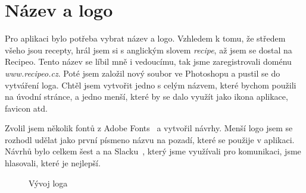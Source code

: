\section{Název a logo}
Pro aplikaci bylo potřeba vybrat název a logo. Vzhledem k tomu, že středem všeho jsou recepty, hrál jsem si s anglickým slovem
\emph{recipe}, až jsem se dostal na Recipeo. Tento název se líbil mně i vedoucímu, tak jsme zaregistrovali doménu \emph{www.recipeo.cz}.
Poté jsem založil nový soubor ve Photoshopu a pustil se do vytváření loga. Chtěl jsem vytvořit jedno s celým názvem, které bychom použili
na úvodní stránce, a jedno menší, které by se dalo využít jako ikona aplikace, favicon atd.

Zvolil jsem několik fontů z Adobe Fonts~\cite{AdobeFonts} a vytvořil návrhy. Menší logo jsem se rozhodl udělat jako první písmeno názvu na pozadí,
které se použije v aplikaci. Návrhů bylo celkem šest a na Slacku~\cite{Slack}, který jsme využívali pro komunikaci, jsme hlasovali, které je nejlepší.

\begin{figure}[h]
    \centering
    \hfill
    \hfill
    \hfill
    \caption{Vývoj loga}
\end{figure}

